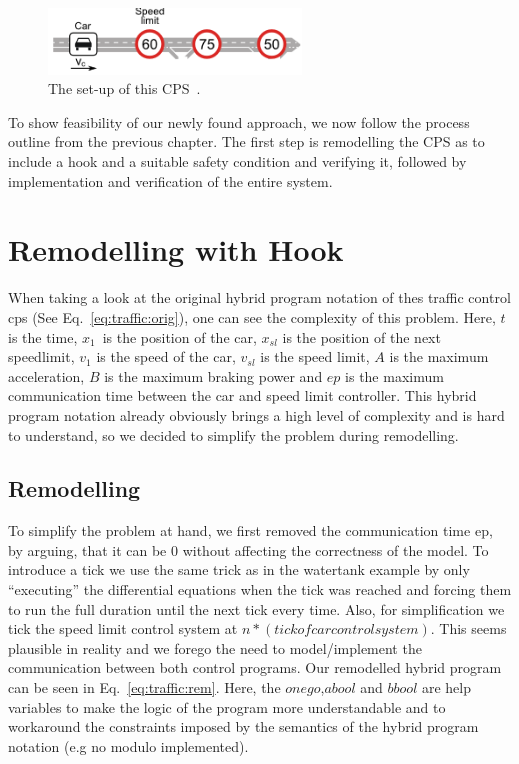 \begin{figure}[h!]
	\centering
	\includegraphics[width=0.6\textwidth]{images/trafficControl}
	\caption{The set-up of this CPS~\cite{keymaera}.}
	\label{fig:trafficControl}
\end{figure}

To show feasibility of our newly found approach, we now follow the process outline from the previous chapter. The first step is remodelling the CPS as to include a hook and a suitable safety condition and verifying it, followed by implementation and verification of the entire system. 

\section{Remodelling with Hook}
\label{sec:traffic:hook}

When taking a look at the original hybrid program notation of thes traffic control cps (See Eq.~\ref{eq:traffic:orig}), one can see the complexity of this problem. Here, \(t\) is the time, \(x_1\)\ is the position of the car, \(x_{sl}\) is the position of the next speedlimit, \(v_1\) is the speed of the car, \(v_{sl}\) is the speed limit, \(A\) is the maximum acceleration, \(B\) is the maximum braking power and \(ep\) is the maximum communication time between the car and speed limit controller. This hybrid program notation already obviously brings a high level of complexity and is hard to understand, so we decided to simplify the problem during remodelling. 

\subsection{Remodelling}
\label{subsec:traffic:remodel}
To simplify the problem at hand, we first removed the communication time ep, by arguing, that it can be 0 without affecting the correctness of the model. To introduce a tick we use the same trick as in the watertank example by only ``executing'' the differential equations when the tick was reached and forcing them to run the full duration until the next tick every time. Also, for simplification we tick the speed limit control system at \(n * (tick of car control system)\). This seems plausible in reality and we forego the need to model/implement the communication between both control programs. Our remodelled hybrid program can be seen in Eq.~\ref{eq:traffic:rem}. Here, the \(onego\),\(abool\) and \(bbool\) are help variables to make the logic of the program more understandable and to workaround the constraints imposed by the semantics of the hybrid program notation (e.g no modulo implemented).

